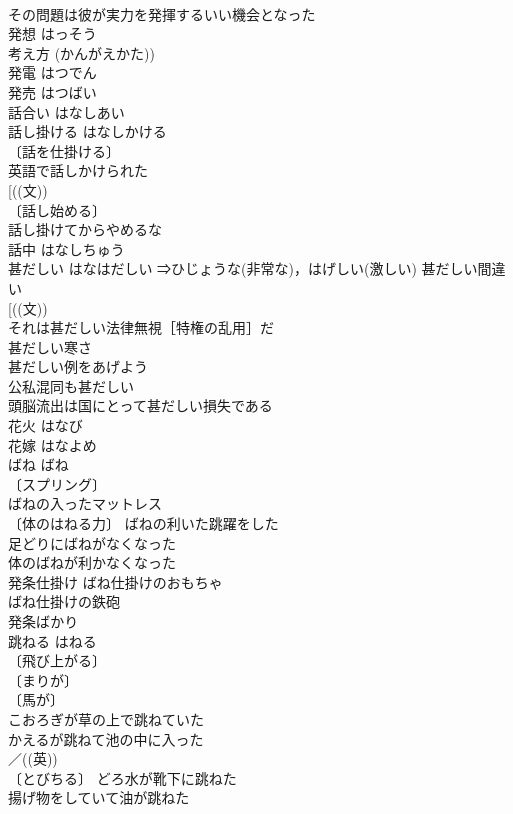 \documentclass[8pt]{extreport}
\begin{document}
\begin{CJK}{UTF8}{min}
\\	その問題は彼が実力を発揮するいい機会となった 
\\	発想	はっそう	
\\	考え方 (かんがえかた))
\\	発電	はつでん	
\\	発売	はつばい	
\\	話合い	はなしあい	
\\	話し掛ける	はなしかける	
\\	〔話を仕掛ける〕
\\	英語で話しかけられた 
\\	[((文))
\\	〔話し始める〕
\\	話し掛けてからやめるな 
\\	話中	はなしちゅう	
\\	甚だしい	はなはだしい	⇒ひじょうな(非常な)，はげしい(激しい) 甚だしい間違い 
\\	[((文))
\\	それは甚だしい法律無視［特権の乱用］だ 
\\	甚だしい寒さ 
\\	甚だしい例をあげよう 
\\	公私混同も甚だしい 
\\	頭脳流出は国にとって甚だしい損失である 
\\	花火	はなび	
\\	花嫁	はなよめ	
\\	ばね	ばね	
\\	〔スプリング〕
\\	ばねの入ったマットレス 
\\	〔体のはねる力〕 ばねの利いた跳躍をした 
\\	足どりにばねがなくなった 
\\	体のばねが利かなくなった 
\\	発条仕掛け ばね仕掛けのおもちゃ 
\\	ばね仕掛けの鉄砲 
\\	発条ばかり 
\\	跳ねる	はねる	
\\	〔飛び上がる〕
\\	〔まりが〕
\\	〔馬が〕
\\	こおろぎが草の上で跳ねていた 
\\	かえるが跳ねて池の中に入った 
\\	／((英))
\\	〔とびちる〕 どろ水が靴下に跳ねた 
\\	揚げ物をしていて油が跳ねた 

\end{CJK}
\end{document}
